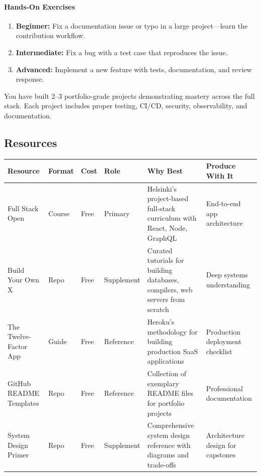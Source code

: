 \documentclass[11pt, a4paper, oneside]{report}
\newcommand{\startalternating}{\rowcolors{2}{white}{gray!5}}
\newcommand{\stopalternating}{\rowcolors{1}{}{}}
\begin{document}
\paragraph{Hands-On Exercises}
\begin{enumerate}[leftmargin=*]
\item \textbf{Beginner:} Fix a documentation issue or typo in a large project---learn the contribution workflow.
\item \textbf{Intermediate:} Fix a bug with a test case that reproduces the issue.
\item \textbf{Advanced:} Implement a new feature with tests, documentation, and review response.
\end{enumerate}

\begin{microcheckpoint}
You have built 2--3 portfolio-grade projects demonstrating mastery across the full stack. Each project includes proper testing, CI/CD, security, observability, and documentation.
\end{microcheckpoint}


\subsection*{Resources}

\setlength{\LTpre}{6pt}
\setlength{\LTpost}{6pt}
\startalternating
\begin{longtable}{L{0.15\textwidth} L{0.10\textwidth} L{0.07\textwidth} L{0.10\textwidth} L{0.30\textwidth} L{0.15\textwidth}}
\toprule
\textbf{Resource} & \textbf{Format} & \textbf{Cost} & \textbf{Role} & \textbf{Why Best} & \textbf{Produce With It} \\
\midrule
\endhead
Full Stack Open & Course & Free & Primary & Helsinki's project-based full-stack curriculum with React, Node, GraphQL & End-to-end app architecture \\
\hline
Build Your Own X & Repo & Free & Supplement & Curated tutorials for building databases, compilers, web servers from scratch & Deep systems understanding \\
\hline
The Twelve-Factor App & Guide & Free & Reference & Heroku's methodology for building production SaaS applications & Production deployment checklist \\
\hline
GitHub README Templates & Repo & Free & Reference & Collection of exemplary README files for portfolio projects & Professional documentation \\
\hline
System Design Primer & Repo & Free & Supplement & Comprehensive system design reference with diagrams and trade-offs & Architecture design for capstones \\
\bottomrule
\end{longtable}
\stopalternating
\end{document}
